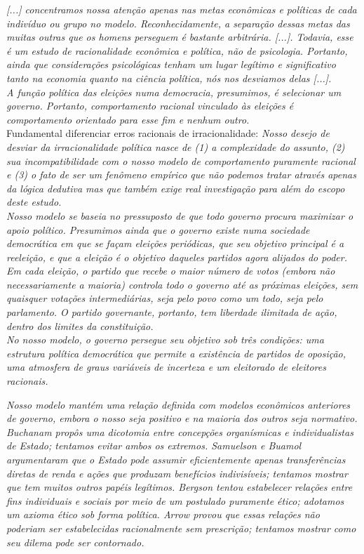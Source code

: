 \noindent \textit{[...] concentramos nossa atenção apenas nas metas econômicas e políticas de cada indivíduo ou grupo no modelo. Reconhecidamente, a separação dessas metas das muitas outras que os homens perseguem é bastante arbitrária. [...]. Todavia, esse é um estudo de racionalidade econômica e política, não de psicologia. Portanto, ainda que considerações psicológicas tenham um lugar legítimo e significativo tanto na economia quanto na ciência política, nós nos desviamos delas [...].} \cite[~p. 28-29]{downs} \\

\noindent \textit{A função política das eleições numa democracia, presumimos, é selecionar um governo. Portanto, comportamento racional vinculado às eleições é comportamento orientado para esse fim e nenhum outro.} \cite[~p. 29]{downs} \\

\noindent Fundamental diferenciar erros racionais de irracionalidade: \textit{Nosso desejo de desviar da irracionalidade política nasce de (1) a complexidade do assunto, (2) sua incompatibilidade com o nosso modelo de comportamento puramente racional e (3) o fato de ser um fenômeno empírico que não podemos tratar através apenas da lógica dedutiva mas que também exige real investigação para além do escopo deste estudo.} \cite[~p. 32]{downs} \\

\noindent \textit{Nosso modelo se baseia no pressuposto de que todo governo procura maximizar o apoio político. Presumimos ainda que o governo existe numa sociedade democrática em que se façam eleições periódicas, que seu objetivo principal é a reeleição, e que a eleição é o objetivo daqueles partidos agora alijados do poder. Em cada eleição, o partido que recebe o maior número de votos (embora não necessariamente a maioria) controla todo o governo até as próximas eleições, sem quaisquer votações intermediárias, seja pelo povo como um todo, seja pelo parlamento. O partido governante, portanto, tem liberdade ilimitada de ação, dentro dos limites da constituição.} \cite[~p. 33]{downs} \\

\textit{No nosso modelo, o governo persegue seu objetivo sob três condições: uma estrutura política democrática que permite a existência de partidos de oposição, uma atmosfera de graus variáveis de incerteza e um eleitorado de eleitores racionais.}

\textit{Nosso modelo mantém uma relação definida com modelos econômicos anteriores de governo, embora o nosso seja positivo e na maioria dos outros seja normativo. Buchanam propôs uma dicotomia entre concepções organísmicas e individualistas de Estado; tentamos evitar ambos os extremos. Samuelson e Buamol argumentaram que o Estado pode assumir eficientemente apenas transferências diretas de renda e ações que produzam benefícios indivisíveis; tentamos mostrar que tem muitos outros papéis legítimos. Bergson tentou estabelecer relações entre fins individuais e sociais por meio de um postulado puramente ético; adotamos um axioma ético sob forma política. Arrow provou que essas relações não poderiam ser estabelecidas racionalmente sem prescrição; tentamos mostrar como seu dilema pode ser contornado.}

